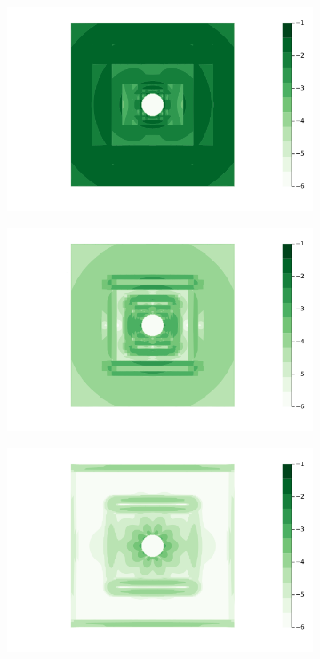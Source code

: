 \documentclass{article}
\begin{document}
\begin{figure}
\begin{subfigure}{.5\textwidth}
  \centering
  \includegraphics[width=\linewidth]{tex/fig/lamb_dipole_error_dist2.png}
  \caption{}
\end{subfigure}%
\begin{subfigure}{.5\textwidth}
  \centering
  \includegraphics[width=\linewidth]{tex/fig/lamb_dipole_error_dist8.png}
  \caption{}
\end{subfigure}
\begin{subfigure}{.5\textwidth}
  \centering
  \includegraphics[width=\linewidth]{tex/fig/lamb_dipole_error_dist32.png}

\end{subfigure}
\end{figure}
\end{document}
